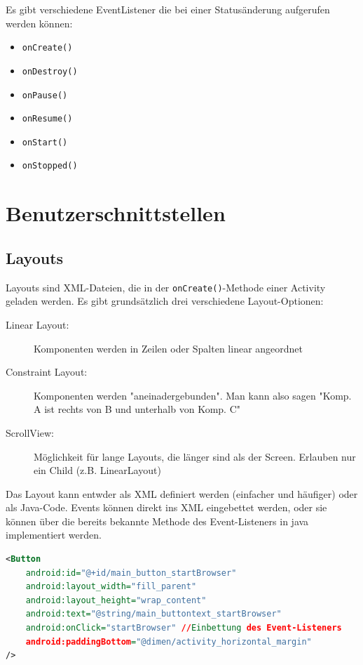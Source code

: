 \documentclass[a4paper, 11pt]{article}
\newcommand{\code}[1]{\texttt{#1}}
\begin{document}
Es gibt verschiedene EventListener die bei einer Statusänderung aufgerufen werden können:

\begin{multicols}{3}
	\begin{itemize}
		\item \code{onCreate()}
		\item \code{onDestroy()}
	\columnbreak
		\item \code{onPause()}
		\item \code{onResume()}
	\columnbreak
		\item \code{onStart()}
		\item \code{onStopped()}
	\end{itemize}
\end{multicols}

\section{Benutzerschnittstellen}
\subsection{Layouts}
Layouts sind XML-Dateien, die in der \code{onCreate()}-Methode einer Activity geladen werden. Es gibt grundsätzlich drei verschiedene Layout-Optionen:

\begin{description}
	\item[Linear Layout: ] Komponenten werden in Zeilen oder Spalten linear angeordnet
	\item[Constraint Layout: ] Komponenten werden "aneinadergebunden". Man kann also sagen "Komp. A ist rechts von B und unterhalb von Komp. C"
	\item[ScrollView: ] Möglichkeit für lange Layouts, die länger sind als der Screen. Erlauben nur ein Child (z.B. LinearLayout)
\end{description}
\vspace{10px}

\noindent Das Layout kann entwder als XML definiert werden (einfacher und häufiger) oder als Java-Code. Events können direkt ins XML eingebettet werden, oder sie können über die bereits bekannte Methode des Event-Listeners in java implementiert werden.

\begin{lstlisting}[language=xml, captionpos=b, caption={Button-Definition in XML}]
<Button
	android:id="@+id/main_button_startBrowser"
	android:layout_width="fill_parent"
	android:layout_height="wrap_content"
	android:text="@string/main_buttontext_startBrowser"
	android:onClick="startBrowser" //Einbettung des Event-Listeners
	android:paddingBottom="@dimen/activity_horizontal_margin"
/>
\end{lstlisting}
\end{document}
